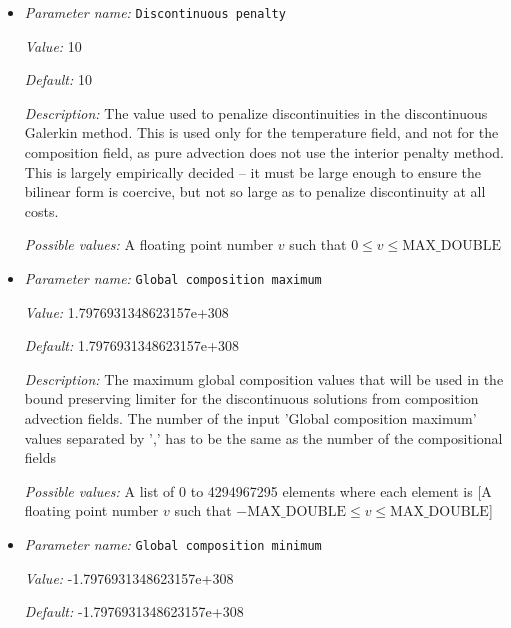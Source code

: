 \begin{itemize}
\item {\it Parameter name:} {\tt Discontinuous penalty}
\label{parameters:Discretization/Stabilization parameters/Discontinuous penalty}


{\it Value:} 10


{\it Default:} 10


{\it Description:} The value used to penalize discontinuities in the discontinuous Galerkin method. This is used only for the temperature field, and not for the composition field, as pure advection does not use the interior penalty method. This is largely empirically decided -- it must be large enough to ensure the bilinear form is coercive, but not so large as to penalize discontinuity at all costs.


{\it Possible values:} A floating point number $v$ such that $0 \leq v \leq \text{MAX\_DOUBLE}$
\item {\it Parameter name:} {\tt Global composition maximum}
\label{parameters:Discretization/Stabilization parameters/Global composition maximum}


{\it Value:} 1.7976931348623157e+308


{\it Default:} 1.7976931348623157e+308


{\it Description:} The maximum global composition values that will be used in the bound preserving limiter for the discontinuous solutions from composition advection fields. The number of the input 'Global composition maximum' values separated by ',' has to be the same as the number of the compositional fields


{\it Possible values:} A list of 0 to 4294967295 elements where each element is [A floating point number $v$ such that $-\text{MAX\_DOUBLE} \leq v \leq \text{MAX\_DOUBLE}$]
\item {\it Parameter name:} {\tt Global composition minimum}
\label{parameters:Discretization/Stabilization parameters/Global composition minimum}


{\it Value:} -1.7976931348623157e+308


{\it Default:} -1.7976931348623157e+308



\end{itemize}
